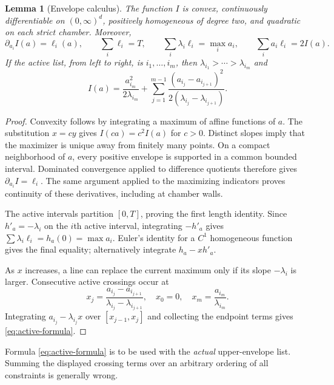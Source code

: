 \documentclass[11pt,a4paper]{article}
\newtheorem{lemma}[theorem]{Lemma}
\theoremstyle{definition}
\theoremstyle{remark}
\numberwithin{equation}{section}
\begin{document}
\begin{lemma}[Envelope calculus]
\label{lem:envelope}
The function $I$ is convex, continuously differentiable on
$(0,\infty)^d$, positively homogeneous of degree two, and quadratic on each
strict chamber. Moreover,
\begin{equation}
 \partial_{a_i}I(a)=\ell_i(a),\qquad
 \sum_i\ell_i=T,
 \qquad \sum_i\lambda_i\ell_i=\max_i a_i,
 \qquad \sum_i a_i\ell_i=2I(a).
 \label{eq:envelope-identities}
\end{equation}
If the active list, from left to right, is $i_1,\ldots,i_m$, then
$\lambda_{i_1}>\cdots>\lambda_{i_m}$ and
\begin{equation}
 I(a)=\frac{a_{i_m}^2}{2\lambda_{i_m}}
 +\sum_{j=1}^{m-1}
 \frac{(a_{i_j}-a_{i_{j+1}})^2}
 {2(\lambda_{i_j}-\lambda_{i_{j+1}})}.
 \label{eq:active-formula}
\end{equation}
\end{lemma}
\begin{proof}
Convexity follows by integrating a maximum of affine functions of $a$.
The substitution $x=cy$ gives $I(ca)=c^2I(a)$ for $c>0$.
Distinct slopes imply that the maximizer is unique away from finitely many
points. On a compact neighborhood of $a$, every positive envelope is
supported in a common bounded interval. Dominated convergence applied to
difference quotients therefore gives $\partial_{a_i}I=\ell_i$.
The same argument applied to the maximizing indicators proves continuity
of these derivatives, including at chamber walls.

The active intervals partition $[0,T]$, proving the first length identity.
Since $h'_a=-\lambda_i$ on the $i$th active interval, integrating $-h'_a$
gives $\sum\lambda_i\ell_i=h_a(0)=\max a_i$. Euler's identity for a
$C^1$ homogeneous function gives the final equality; alternatively integrate
$h_a-xh'_a$.

As $x$ increases, a line can replace the current maximum only if its slope
$-\lambda_i$ is larger. Consecutive active crossings occur at
\[
 x_j=\frac{a_{i_j}-a_{i_{j+1}}}{\lambda_{i_j}-\lambda_{i_{j+1}}},
 \quad x_0=0,\quad x_m=\frac{a_{i_m}}{\lambda_{i_m}}.
\]
Integrating $a_{i_j}-\lambda_{i_j}x$ over $[x_{j-1},x_j]$ and
collecting the endpoint terms gives \eqref{eq:active-formula}.
\end{proof}

Formula \eqref{eq:active-formula} is to be used with the \emph{actual}
upper-envelope list. Summing the displayed crossing terms over an arbitrary
ordering of all constraints is generally wrong.
\end{document}
